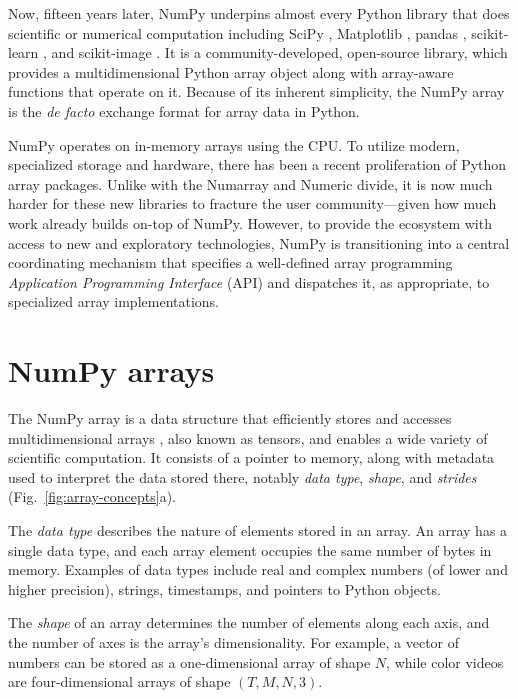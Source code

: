 Now, fifteen years later, NumPy underpins almost every Python library that does scientific or
numerical computation including SciPy \cite{virtanen2020scipy},
Matplotlib \cite{hunter2007matplotlib}, pandas \cite{mckinney-proc-scipy-2010},
scikit-learn \cite{pedregosa2011scikit}, and
scikit-image \cite{vanderwalt2014scikit}.
It is a community-developed, open-source library, which provides a
multidimensional Python array object along with array-aware functions
that operate on it.
Because of its inherent simplicity, the NumPy array is
the \emph{de facto} exchange format for array data in Python.

NumPy operates on in-memory arrays using the CPU. To utilize modern,
specialized storage and hardware, there has been a recent
proliferation of Python array packages. Unlike with the Numarray and
Numeric divide, it is now much harder for these new libraries to
fracture the user community---given how much work already builds
on-top of NumPy.  However, to provide the ecosystem with access to
new and exploratory technologies, NumPy is transitioning into a
central coordinating mechanism that specifies a well-defined array
programming \emph{Application Programming Interface} (API) and
dispatches it, as appropriate, to specialized array implementations.

\section*{NumPy arrays}

The NumPy array is a data structure that efficiently stores and accesses
multidimensional arrays \cite{vanderwalt2011numpy}, also known as tensors, and
enables a wide variety of scientific computation.
It consists of a pointer to memory, along with metadata used to interpret the
data stored there, notably {\em data type}, {\em shape}, and {\em strides}
(Fig.~\ref{fig:array-concepts}a).

The \emph{data type} describes the nature of elements stored in an array.
An array has a single data type, and each array element occupies the same
number of bytes in memory.
Examples of data types include real and complex numbers (of lower and higher
precision), strings, timestamps, and pointers to Python objects.

The \emph{shape} of an array determines the number of elements along each axis,
and the number of axes is the array's dimensionality.
For example, a vector of numbers can be stored as a one-dimensional array of
shape $N$, while color videos are four-dimensional arrays of shape
$(T, M, N, 3)$.

